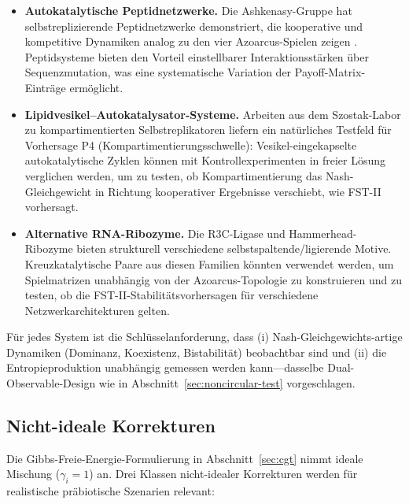 \documentclass[12pt,a4paper]{article}
\theoremstyle{remark}
\begin{document}
\begin{itemize}
    \item \textbf{Autokatalytische Peptidnetzwerke.} Die Ashkenasy-Gruppe hat selbstreplizierende Peptidnetzwerke demonstriert, die kooperative und kompetitive Dynamiken analog zu den vier Azoarcus-Spielen zeigen \citep{Ashkenasy2004}. Peptidsysteme bieten den Vorteil einstellbarer Interaktionsst\"arken \"uber Sequenzmutation, was eine systematische Variation der Payoff-Matrix-Eintr\"age erm\"oglicht.
    \item \textbf{Lipidvesikel--Autokatalysator-Systeme.} Arbeiten aus dem Szostak-Labor zu kompartimentierten Selbstreplikatoren \citep{Szostak2001} liefern ein nat\"urliches Testfeld f\"ur Vorhersage P4 (Kompartimentierungsschwelle): Vesikel-eingekapselte autokatalytische Zyklen k\"onnen mit Kontrollexperimenten in freier L\"osung verglichen werden, um zu testen, ob Kompartimentierung das Nash-Gleichgewicht in Richtung kooperativer Ergebnisse verschiebt, wie FST-II vorhersagt.
    \item \textbf{Alternative RNA-Ribozyme.} Die R3C-Ligase \citep{Rogers2001} und Hammerhead-Ribozyme \citep{Hammerhead1986} bieten strukturell verschiedene selbstspaltende/ligierende Motive. Kreuzkatalytische Paare aus diesen Familien k\"onnten verwendet werden, um Spielmatrizen unabh\"angig von der Azoarcus-Topologie zu konstruieren und zu testen, ob die FST-II-Stabilit\"atsvorhersagen f\"ur verschiedene Netzwerkarchitekturen gelten.
\end{itemize}

\noindent
F\"ur jedes System ist die Schl\"usselanforderung, dass (i) Nash-Gleichgewichts-artige Dynamiken (Dominanz, Koexistenz, Bistabilit\"at) beobachtbar sind und (ii) die Entropieproduktion unabh\"angig gemessen werden kann---dasselbe Dual-Observable-Design wie in Abschnitt~\ref{sec:noncircular-test} vorgeschlagen.

\subsection{Nicht-ideale Korrekturen}
\label{sec:nonideal-corrections}

Die Gibbs-Freie-Energie-Formulierung in Abschnitt~\ref{sec:cgt} nimmt ideale Mischung ($\gamma_i = 1$) an. Drei Klassen nicht-idealer Korrekturen werden f\"ur realistische pr\"abiotische Szenarien relevant:
\end{document}
